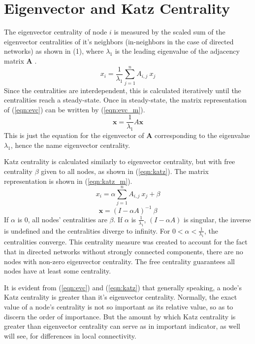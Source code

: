 \documentclass{IEEEtran}
\begin{document}
	\section{Eigenvector and Katz Centrality}
	\label{s:cent}
	The eigenvector centrality of node $i$ is measured by the scaled sum of the eigenvector centralities of it's neighbors (in-neighbors in the case of directed networks) as shown in (1), where $\lambda_1$ is the leading eigenvalue of the adjacency matrix $\mathbf{A}$ \cite{EVC}.
	\begin{equation}
	\label{eqn:evc}
	x_i = \frac{1}{\lambda_1}\sum_{j=1}^{n}A_{i,j}~x_j
	\end{equation}
	Since the centralities are interdependent, this is calculated iteratively until the centralities reach a steady-state. Once in steady-state, the matrix representation of (\ref{eqn:evc}) can be written by (\ref{eqn:evc_m}).
	\begin{equation}
	\label{eqn:evc_m}
	\mathbf{x} = \frac{1}{\lambda_1}A\mathbf{x}
	\end{equation}
	This is just the equation for the eigenvector of $\mathbf{A}$ corresponding to the eigenvalue $\lambda_1$, hence the name eigenvector centrality.
	
	Katz centrality is calculated similarly to eigenvector centrality, but with free centrality $\beta$ given to all nodes, as shown in (\ref{eqn:katz})\cite{katz}. The matrix representation is shown in (\ref{eqn:katz_m}).
	\begin{equation}
	\label{eqn:katz}
	x_i = \alpha\sum_{j=1}^{n}A_{i,j}~x_j + \beta
	\end{equation}
	\begin{equation}
	\label{eqn:katz_m}
	\mathbf{x} = (I-\alpha A)^{-1}~\beta
	\end{equation}
	If $\alpha$ is 0, all nodes' centralities are $\beta$. If $\alpha$ is $\frac{1}{\lambda_1}$, $(I-\alpha A)$ is singular, the inverse is undefined and the centralities diverge to infinity. For $0 < \alpha < \frac{1}{\lambda_1}$, the centralities converge. This centrality measure was created to account for the fact that in directed networks without strongly connected components, there are no nodes with non-zero eigenvector centrality. The free centrality guarantees all nodes have at least some centrality.
	
	It is evident from (\ref{eqn:evc}) and (\ref{eqn:katz}) that generally speaking, a node's Katz centrality is greater than it's eigenvector centrality. Normally, the exact value of a node's centrality is not so important as its relative value, so as to discern the order of importance. But the amount by which Katz centrality is greater than eigenvector centrality can serve as in important indicator, as well will see, for differences in local connectivity.
	
\end{document}
